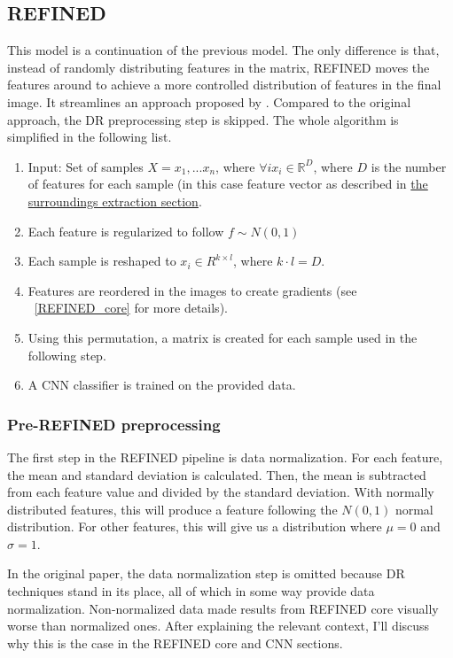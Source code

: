 \subsection{REFINED}

This model is a continuation of the previous model. The only difference is that, instead of randomly distributing features in the matrix, REFINED moves the features around to achieve a more controlled distribution of features in the final image. It streamlines an approach proposed by \cite{REFINED}. Compared to the original approach, the DR preprocessing step is skipped. The whole algorithm is simplified in the following list. 

\begin{enumerate}
    \item Input: Set of samples $X = x_1, ... x_n$, where $\forall i x_i \in \mathbb{R}^{D}$, where $D$ is the number of features for each sample (in this case feature vector as described in \hyperref[Surroundings]{the surroundings extraction section}.
    \item Each feature is regularized to follow $f \sim N(0,1)$
    \item Each sample is reshaped to $x_i \in R^{k\times l}$, where $k\cdot l = D$.
    \item Features are reordered in the images to create gradients (see ~\ref{REFINED_core} for more details).
    \item Using this permutation, a matrix is created for each sample used in the following step.
    \item A \ac{CNN} classifier is trained on the provided data.
\end{enumerate}

\subsubsection{Pre-REFINED preprocessing}

The first step in the REFINED pipeline is data normalization. For each feature, the mean and standard deviation is calculated. Then, the mean is subtracted from each feature value and divided by the standard deviation. With normally distributed features, this will produce a feature following the $N(0,1)$ normal distribution. For other features, this will give us a distribution where $\mu=0$ and $\sigma=1$. 

In the original paper, the data normalization step is omitted because DR techniques stand in its place, all of which in some way provide data normalization. Non-normalized data made results from REFINED core visually worse than normalized ones. After explaining the relevant context, I'll discuss why this is the case in the REFINED core and \ac{CNN} sections.

